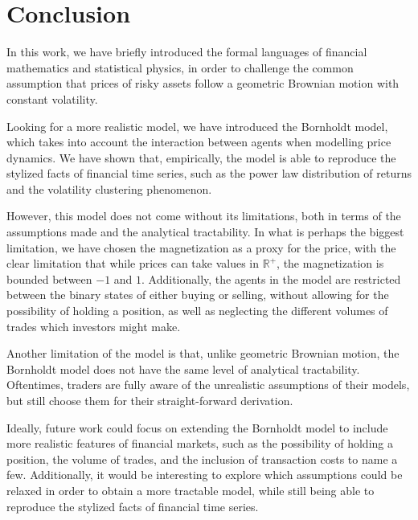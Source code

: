 \chapter{Conclusion}\label{ch:conclusion}
In this work, we have briefly introduced the formal languages of financial mathematics and statistical physics, in order to challenge the common assumption that prices of risky assets follow a geometric Brownian motion with constant volatility.

Looking for a more realistic model, we have introduced the Bornholdt model, which takes into account the interaction between agents when modelling price dynamics. We have shown that, empirically, the model is able to reproduce the stylized facts of financial time series, such as the power law distribution of returns and the volatility clustering phenomenon.

However, this model does not come without its limitations, both in terms of the assumptions made and the analytical tractability. In what is perhaps the biggest limitation, we have chosen the magnetization as a proxy for the price, with the clear limitation that while prices can take values in \(\mathbb{R}^+\), the magnetization is bounded between \(-1\) and \(1\). Additionally, the agents in the model are restricted between the binary states of either buying or selling, without allowing for the possibility of holding a position, as well as neglecting the different volumes of trades which investors might make.

Another limitation of the model is that, unlike geometric Brownian motion, the Bornholdt model does not have the same level of analytical tractability. Oftentimes, traders are fully aware of the unrealistic assumptions of their models, but still choose them for their straight-forward derivation.

Ideally, future work could focus on extending the Bornholdt model to include more realistic features of financial markets, such as the possibility of holding a position, the volume of trades, and the inclusion of transaction costs to name a few. Additionally, it would be interesting to explore which assumptions could be relaxed in order to obtain a more tractable model, while still being able to reproduce the stylized facts of financial time series.
